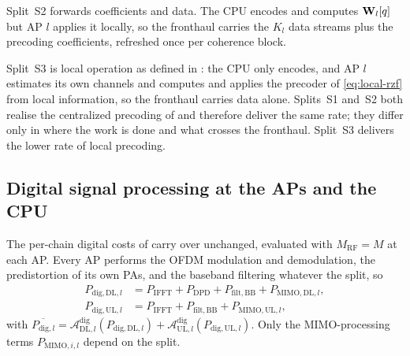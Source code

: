 Split~S2 forwards coefficients and data. The CPU encodes and computes $\boldsymbol{\mathrm{W}}_{l}[q]$ but AP $l$
applies it locally, so the fronthaul carries the $K_{l}$ data streams plus the
precoding coefficients, refreshed once per coherence block. 


Split~S3 is local operation as defined in : the CPU only encodes, and AP $l$
estimates its own channels and computes and applies the precoder of
\eqref{eq:local-rzf} from local information, so the fronthaul carries data alone.
Splits~S1 and~S2 both realise the centralized precoding of
 and therefore deliver the same rate; they differ only in
where the work is done and what crosses the fronthaul. Split~S3 delivers the
lower rate of local precoding.

\subsection{Digital signal processing at the APs and the CPU}
\label{ssec:dmimo_dig}
The per-chain digital costs of  carry over unchanged, evaluated
with $M_{\mathrm{RF}}=M$ at each AP. Every AP performs the OFDM modulation and
demodulation, the predistortion of its own PAs, and the baseband filtering
whatever the split, so
\begin{align}
\label{eq:dig_ap}
P_{\mathrm{dig,DL},l} &= P_{\mathrm{IFFT}} + P_{\mathrm{DPD}}
+ P_{\mathrm{filt,BB}} + P_{\mathrm{MIMO,DL},l},\\
P_{\mathrm{dig,UL},l} &= P_{\mathrm{IFFT}} + P_{\mathrm{filt,BB}}
+ P_{\mathrm{MIMO,UL},l},
\end{align}
with $\overline{P_{\mathrm{dig},l}}=
\mathcal{A}_{\mathrm{DL},l}^{\mathrm{dig}}(P_{\mathrm{dig,DL},l})+
\mathcal{A}_{\mathrm{UL},l}^{\mathrm{dig}}(P_{\mathrm{dig,UL},l})$. Only the
MIMO-processing terms $P_{\mathrm{MIMO},i,l}$ depend on the split.

